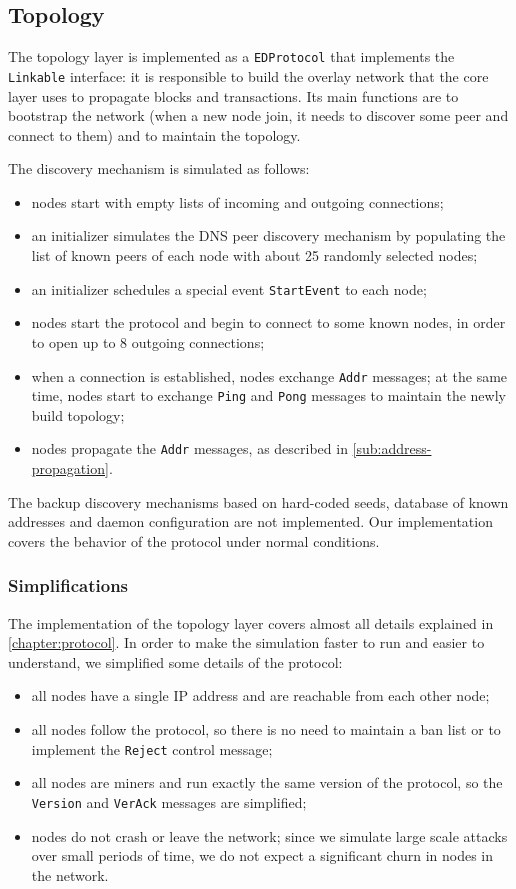 \subsection{Topology}
The topology layer is implemented as a \texttt{EDProtocol} that implements the \texttt{Linkable} interface:
it is responsible to build the overlay network that the core layer uses to propagate blocks and transactions.
Its main functions are to bootstrap the network (when a new node join, it needs to discover some peer and connect to them) and to maintain the topology.

\medskip
\noindent
The discovery mechanism is simulated as follows:
\begin{itemize}
	\item nodes start with empty lists of incoming and outgoing connections;
	\item an initializer simulates the DNS peer discovery mechanism by populating the list of known peers of each node with about \num{25} randomly selected nodes;
	\item an initializer schedules a special event \texttt{StartEvent} to each node;
	\item nodes start the protocol and begin to connect to some known nodes, in order to open up to \num{8} outgoing connections;
	\item when a connection is established, nodes exchange \texttt{Addr} messages; at the same time, nodes start to exchange \texttt{Ping} and \texttt{Pong} messages to maintain the newly build topology;
	\item nodes propagate the \texttt{Addr} messages, as described in \cref{sub:address-propagation}.
\end{itemize}
The backup discovery mechanisms based on hard-coded seeds, database of known addresses and daemon configuration are not implemented.
Our implementation covers the behavior of the protocol under normal conditions.

\subsubsection{Simplifications}
The implementation of the topology layer covers almost all details explained in \cref{chapter:protocol}.
In order to make the simulation faster to run and easier to understand, we simplified some details of the protocol:
\begin{itemize}
	\item all nodes have a single IP address and are reachable from each other node;
	\item all nodes follow the protocol, so there is no need to maintain a ban list or to implement the \texttt{Reject} control message;
	\item all nodes are miners and run exactly the same version of the protocol, so the \texttt{Version} and \texttt{VerAck} messages are simplified;
	\item nodes do not crash or leave the network; since we simulate large scale attacks over small periods of time, we do not expect a significant churn in nodes in the network.
\end{itemize}

